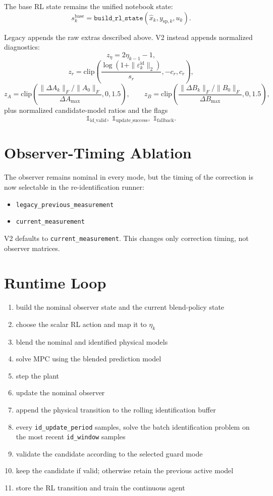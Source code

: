 \documentclass[11pt]{article}
\begin{document}
The base RL state remains the unified notebook state:
\[
s_k^{\mathrm{base}} = \texttt{build\_rl\_state}(\hat{x}_k, y_{\mathrm{sp},k}, u_k).
\]

Legacy appends the raw extras described above. V2 instead appends normalized
diagnostics:
\[
z_\eta = 2\eta_{k-1} - 1,
\]
\[
z_r = \mathrm{clip}\!\left(
\frac{\log(1 + \|\varepsilon_k^{\mathrm{id}}\|_2)}{s_r},
-c_r, c_r
\right),
\]
\[
z_A = \mathrm{clip}\!\left(\frac{\|\Delta A_k\|_F / \|A_0\|_F}{\Delta A_{\max}}, 0, 1.5\right),
\qquad
z_B = \mathrm{clip}\!\left(\frac{\|\Delta B_k\|_F / \|B_0\|_F}{\Delta B_{\max}}, 0, 1.5\right),
\]
plus normalized candidate-model ratios and the flags
\[
\mathbb{1}_{\mathrm{id\_valid}},\;
\mathbb{1}_{\mathrm{update\_success}},\;
\mathbb{1}_{\mathrm{fallback}}.
\]

\section*{Observer-Timing Ablation}

The observer remains nominal in every mode, but the timing of the correction is
now selectable in the re-identification runner:

\begin{itemize}
\item \texttt{legacy\_previous\_measurement}
\item \texttt{current\_measurement}
\end{itemize}

V2 defaults to \texttt{current\_measurement}. This changes only correction
timing, not observer matrices.

\section*{Runtime Loop}

\begin{enumerate}
\item build the nominal observer state and the current blend-policy state
\item choose the scalar RL action and map it to $\eta_k$
\item blend the nominal and identified physical models
\item solve MPC using the blended prediction model
\item step the plant
\item update the nominal observer
\item append the physical transition to the rolling identification buffer
\item every \texttt{id\_update\_period} samples, solve the batch
      identification problem on the most recent \texttt{id\_window} samples
\item validate the candidate according to the selected guard mode
\item keep the candidate if valid; otherwise retain the previous active model
\item store the RL transition and train the continuous agent
\end{enumerate}
\end{document}
